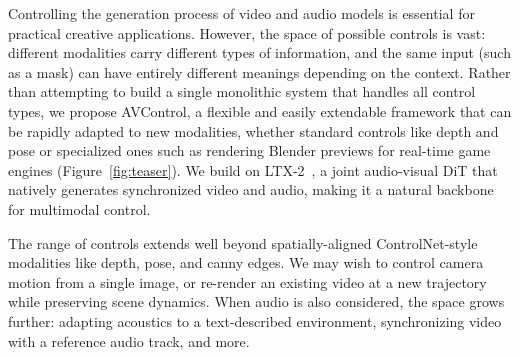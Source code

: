 

Controlling the generation process of video and audio models is essential for practical creative applications.
However, the space of possible controls is vast: different modalities carry different types of information, and the same input (such as a mask) can have entirely different meanings depending on the context.
Rather than attempting to build a single monolithic system that handles all control types, we propose AVControl, a flexible and easily extendable framework that can be rapidly adapted to new modalities, whether standard controls like depth and pose or specialized ones such as rendering Blender previews for real-time game engines (Figure~\ref{fig:teaser}).
We build on LTX-2~\cite{hacohen2026ltx2}, a joint audio-visual DiT that natively generates synchronized video and audio, making it a natural backbone for multimodal control.

The range of controls extends well beyond spatially-aligned ControlNet-style~\cite{zhang2023controlnet} modalities like depth, pose, and canny edges.
We may wish to control camera motion from a single image, or re-render an existing video at a new trajectory while preserving scene dynamics.
When audio is also considered, the space grows further: adapting acoustics to a text-described environment, synchronizing video with a reference audio track, and more.

